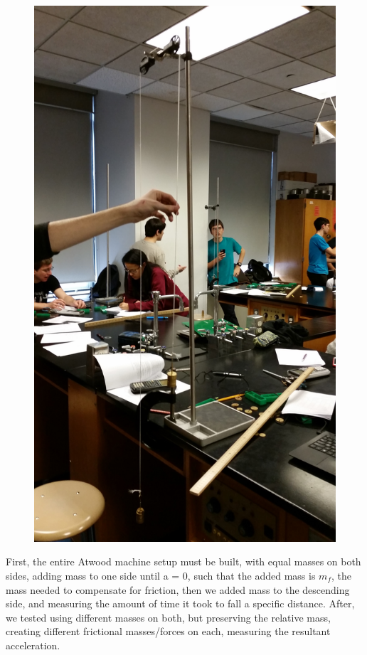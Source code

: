 \documentclass[11pt, titlepage]{article}
\begin{document}
\begin{figure}[t]
\includegraphics[scale=0.1, angle=270]{lab1.jpg}
\end{figure}

First, the entire Atwood machine setup must be built, with equal masses on both sides, adding mass to one side until a = 0, such that the added mass is $m_f$, the mass needed to compensate for friction, then we added mass to the descending side, and measuring the amount of time it took to fall a specific distance. After, we tested using different masses on both, but preserving the relative mass,  creating different frictional masses/forces on each, measuring the resultant acceleration.
\end{document}
